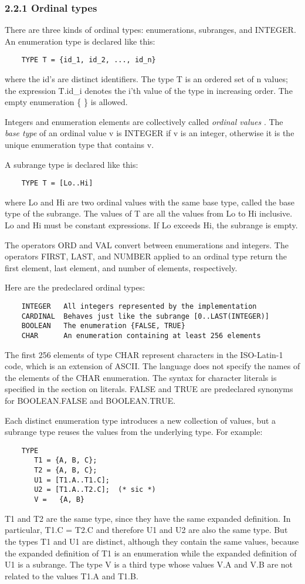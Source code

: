 \documentclass[10pt]{article}
\begin{document}
\subsubsection*{2.2.1 Ordinal types}

There are three kinds of ordinal types: enumerations, subranges, and
INTEGER. An enumeration type is declared like this:
\begin{verbatim}
    TYPE T = {id_1, id_2, ..., id_n}
\end{verbatim}
where the id's are distinct identifiers. The type T is an ordered set of n
values; the expression T.id\_i denotes the i'th value of the type in
increasing order. The empty enumeration \{ \} is allowed.

Integers and enumeration elements are collectively called \emph{ordinal
  values} . The \emph{base type} of an ordinal value v is INTEGER if v is an
integer, otherwise it is the unique enumeration type that contains v.

A subrange type is declared like this:
\begin{verbatim}
    TYPE T = [Lo..Hi]
\end{verbatim}
where Lo and Hi are two ordinal values with the same base type, called the
base type of the subrange. The values of T are all the values from Lo to Hi
inclusive. Lo and Hi must be constant expressions. If Lo exceeds Hi, the
subrange is empty.

The operators ORD and VAL convert between enumerations and integers. The
operators FIRST, LAST, and NUMBER applied to an ordinal type return the first
element, last element, and number of elements, respectively.

Here are the predeclared ordinal types:
\begin{verbatim}
    INTEGER   All integers represented by the implementation
    CARDINAL  Behaves just like the subrange [0..LAST(INTEGER)]
    BOOLEAN   The enumeration {FALSE, TRUE}
    CHAR      An enumeration containing at least 256 elements
\end{verbatim}
The first 256 elements of type CHAR represent characters in the ISO-Latin-1
code, which is an extension of ASCII. The language does not specify the names
of the elements of the CHAR enumeration. The syntax for character literals is
specified in the section on literals. FALSE and TRUE are predeclared synonyms
for BOOLEAN.FALSE and BOOLEAN.TRUE.

Each distinct enumeration type introduces a new collection of values, but a
subrange type reuses the values from the underlying type. For example:
\begin{verbatim}
    TYPE
       T1 = {A, B, C};
       T2 = {A, B, C};
       U1 = [T1.A..T1.C];
       U2 = [T1.A..T2.C];  (* sic *)
       V =   {A, B}
\end{verbatim}
T1 and T2 are the same type, since they have the same expanded definition. In
particular, T1.C = T2.C and therefore U1 and U2 are also the same type. But
the types T1 and U1 are distinct, although they contain the same values,
because the expanded definition of T1 is an enumeration while the expanded
definition of U1 is a subrange. The type V is a third type whose values V.A
and V.B are not related to the values T1.A and T1.B.
\end{document}
